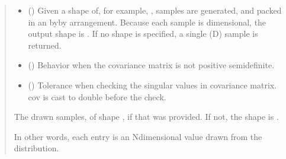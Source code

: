 \documentclass[letterpaper,10pt,english]{sphinxmanual}
\begin{document}
\begin{fulllineitems}
\begin{quote}
\begin{description}
\begin{itemize}
\item {} 
\sphinxAtStartPar
{} (\sphinxstyleliteralemphasis{\sphinxupquote{, }}) \textendash{} Given a shape of, for example, ,  samples are
generated, and packed in an \sphinxhyphen{}by\sphinxhyphen{}\sphinxhyphen{}by\sphinxhyphen{} arrangement.  Because
each sample is \sphinxhyphen{}dimensional, the output shape is .
If no shape is specified, a single (\sphinxhyphen{}D) sample is returned.

\item {} 
\sphinxAtStartPar
{} (\sphinxstyleliteralemphasis{\sphinxupquote{, }}\sphinxstyleliteralemphasis{\sphinxupquote{, }}\sphinxstyleliteralemphasis{\sphinxupquote{, }}) \textendash{} Behavior when the covariance matrix is not positive semidefinite.

\item {} 
\sphinxAtStartPar
{} (\sphinxstyleliteralemphasis{\sphinxupquote{, }}) \textendash{} Tolerance when checking the singular values in covariance matrix.
cov is cast to double before the check.

\end{itemize}

\sphinxAtStartPar

\sphinxAtStartPar
{} \textendash{} The drawn samples, of shape , if that was provided.  If not,
the shape is .

\sphinxAtStartPar
In other words, each entry  is an N\sphinxhyphen{}dimensional
value drawn from the distribution.



\end{description}
\end{quote}
\end{fulllineitems}
\end{document}
